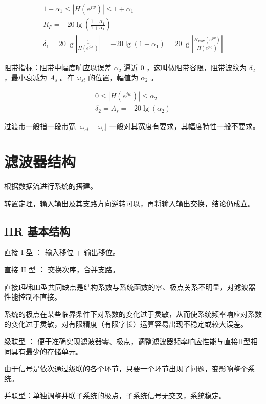 \documentclass[cn,11pt,chinese,black,simple]{elegantbook}
\begin{document}
\[
\begin{array}{l}
1-\alpha_{1} \leq\left|H\left(e^{j w}\right)\right| \leq 1+\alpha_{1} \\
R_{P}=-20 \lg \left(\frac{1-\alpha_{1}}{1+\alpha_{1}}\right) \\
\delta_{1}=20 \lg \left|\frac{1}{H\left(e^{j \omega_{c}}\right)}\right|=-20 \lg \left(1-\alpha_{1}\right)=20 \lg \left|\frac{H_{\max }\left(e^{j w}\right)}{H\left(e^{j \omega_{c}}\right)}\right|
\end{array}
\]

阻带指标：阻带中幅度响应以误差 \(\alpha_2\) 逼近 \(0\) ，这叫做阻带容限，阻带波纹为 \(\delta_2\) ，最小衰减为 \(A_s\) 。在 \(\omega_{st}\) 的位置，幅值为 \(\alpha_2\) 。

\[
\begin{array}{l}
0 \leq\left|H\left(e^{j w}\right)\right| \leq \alpha_{2} \\
\delta_{2}=A_{s}=-20 \lg \left(\alpha_{2}\right)
\end{array}
\]

过渡带一般指一段带宽 \(|\omega_{st} - \omega_c|\) 一般对其宽度有要求，其幅度特性一般不要求。


\section{滤波器结构}

根据数据流进行系统的搭建。

转置定理，输入输出及其支路方向逆转可以，再将输入输出交换，结论仍成立。

\subsection{IIR 基本结构}

{直接 I 型} ： 输入移位 + 输出移位。

直接 II 型 ： 交换次序，合并支路。

直接I型和II型共同缺点是结构系数与系统函数的零、极点关系不明显，对滤波器性能控制不直接。

系统的极点在某些临界条件下对系数的变化过于灵敏，从而使系统频率响应对系数的变化过于灵敏，对有限精度（有限字长）运算容易出现不稳定或较大误差。

级联型 ： 便于准确实现滤波器零、极点，调整滤波器频率响应性能与直接II型相同具有最少的存储单元。

由于信号是依次通过级联的各个环节，只要一个环节出现了问题，变影响整个系统。

并联型：单独调整并联子系统的极点，子系统信号无交叉，系统稳定。
\end{document}
